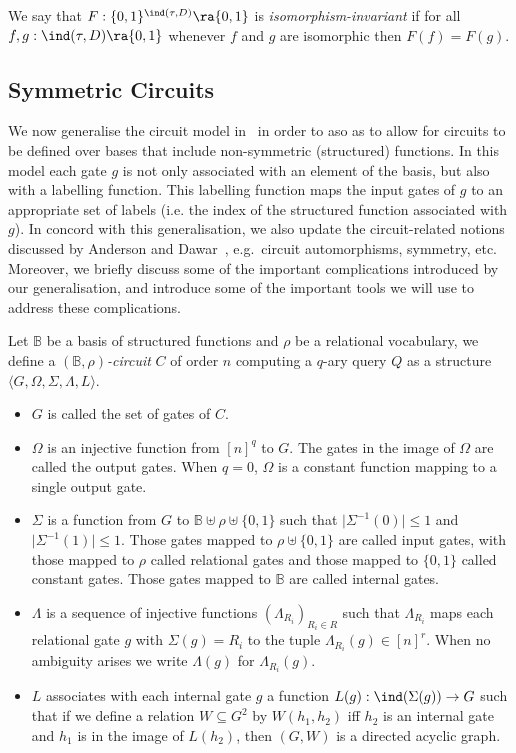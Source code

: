 \documentclass[a4paper,UKenglish]{lipics-v2018}
\begin{document}
We say that $F : \{0,1\}^{\ind(\tau,D)} \ra \{0,1\}$ is
\emph{isomorphism-invariant} if for all $f, g : \ind(\tau, D) \ra \{0,1\}$
whenever $f$ and $g$ are isomorphic then $F(f) = F(g)$.

\subsection{Symmetric Circuits}
We now generalise the circuit model in~\cite{AndersonD17} in order to aso as to
allow for circuits to be defined over bases that include non-symmetric
(structured) functions. In this model each gate $g$ is not only associated with
an element of the basis, but also with a labelling function. This labelling
function maps the input gates of $g$ to an appropriate set of labels (i.e. the
index of the structured function associated with $g$). In concord with this
generalisation, we also update the circuit-related notions discussed by Anderson
and Dawar~\cite{AndersonD17}, e.g.\ circuit automorphisms, symmetry, etc.
Moreover, we briefly discuss some of the important complications introduced by
our generalisation, and introduce some of the important tools we will use to
address these complications.

\begin{definition}
  Let $\mathbb{B}$ be a basis of structured functions and $\rho$ be a relational
  vocabulary, we define a \emph{$(\mathbb{B}, \rho)$-circuit} $C$ of order $n$
  computing a $q$-ary query $Q$ as a structure $\langle G, \Omega, \Sigma,
  \Lambda, L \rangle$.
  \begin{itemize}
    \setlength\itemsep{0mm}
  \item $G$ is called the set of gates of
    $C$.%
  \item $\Omega$ is an injective function from $[n]^q$ to $G$. The gates in the
    image of $\Omega$ are called the output gates. When $q = 0$, $\Omega$ is a
    constant function mapping to a single output gate.
  \item $\Sigma$ is a function from $G$ to $\mathbb{B} \uplus \rho \uplus
    \{0,1\} $ such that $\vert \Sigma^{-1} (0) \vert \leq 1$ and $\vert
    \Sigma^{-1} (1) \vert \leq 1$. Those gates mapped to $\rho \uplus \{0,1\}$
    are called input gates, with those mapped to $\rho$ called relational gates
    and those mapped to $\{0,1\}$ called constant gates. Those gates mapped to
    $\mathbb{B}$ are called internal gates.
  \item $\Lambda$ is a sequence of injective functions $(\Lambda_{R_i})_{R_i \in
      R}$ such that $\Lambda_{R_i}$ maps each relational gate $g$ with $\Sigma
    (g) = R_i$ to the tuple $\Lambda_{R_i} (g) \in [n]^{r}$. When no ambiguity
    arises we write $\Lambda (g)$ for $\Lambda_{R_i} (g)$.
  \item $L$ associates with each internal gate $g$ a function $L(g):
    \ind(\Sigma(g)) \rightarrow G$ such that if we define a relation $W
    \subseteq G^{2}$ by $W(h_1,h_2)$ iff $h_2$ is an internal gate and $h_1$ is
    in the image of $L(h_2)$, then $(G, W)$ is a directed acyclic graph.
  \end{itemize}
\end{definition}
\end{document}
